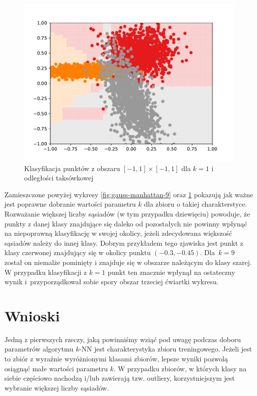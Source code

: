 \documentclass[11pt,a4paper]{article}
\begin{document}
\begin{figure}[H]
  \centering
  \includegraphics[width=.8\textwidth]{res/gauss-manhattan-1.pdf}
  \caption{Klasyfikacja punktów z obszaru $[-1,1] \times [-1,1]$ dla $k = 1$ i odległości taksówkowej}
  \label{fig:gauss-manhattan-1}
\end{figure}

Zamieszczone powyżej wykresy \ref{fig:gauss-manhattan-9} oraz \ref{fig:gauss-manhattan-1} pokazują jak ważne jest poprawne dobranie wartości parametru $k$ dla zbioru o takiej charakterstyce. Rozważanie większej liczby sąsiadów (w tym przypadku dziewięciu) powoduje, że punkty z danej klasy znajdujące się daleko od pozostałych nie powinny wpłynąć na niepoprawną klasyfikację w swojej okolicy, jeżeli zdecydowana większość sąsiadów należy do innej klasy. Dobrym przykładem tego zjawiska jest punkt z klasy czerwonej znajdujący się w okolicy punktu $(-0.3, -0.45)$. Dla~$k=9$ został on niemalże pominięty i znajduje się w obszarze należącym do klasy szarej. W przypadku klasyfikacji z $k=1$ punkt ten znacznie wpłynął na ostateczny wynik i~przyporządkował sobie spory obszar trzeciej ćwiartki wykresu.

\section{Wnioski}

Jedną z pierwszych rzeczy, jaką powinniśmy wziąć pod uwagę podczas doboru parametrów algorytmu $k$-NN jest charakterystyka zbioru treningowego. Jeżeli jest to zbiór z wyraźnie wyróżnionymi klasami zbiorów, lepsze wyniki pozwolą osiągnąć małe wartości parametru $k$. W przypadku zbiorów, w których klasy na siebie częściowo nachodzą i/lub zawierają tzw. outliery, korzystniejszym jest wybranie większej liczby sąsiadów.
\end{document}
